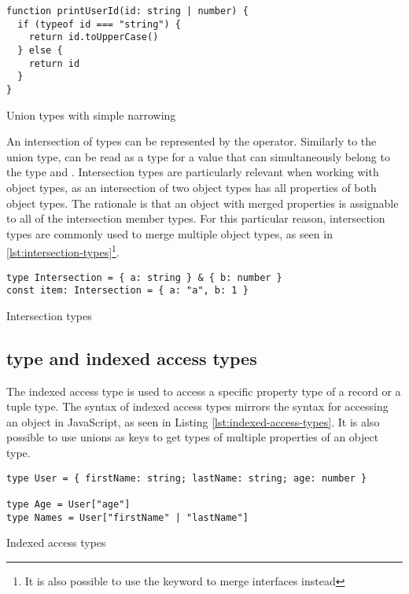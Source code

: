 \begin{listing}[ht]
  \begin{verbatim}
function printUserId(id: string | number) {
  if (typeof id === "string") {
    return id.toUpperCase()
  } else {
    return id
  }
}
  \end{verbatim}
  \caption{Union types with simple narrowing}\label{lst:union-types}
\end{listing}

An intersection of types can be represented by the \code{\&} operator. Similarly to the union type,  can be read as a type for a value that can simultaneously belong to the type  and . Intersection types are particularly relevant when working with object types, as an intersection of two object types has all properties of both object types. The rationale is that an object with merged properties is assignable to all of the intersection member types. For this particular reason, intersection types are commonly used to merge multiple object types, as seen in \ref{lst:intersection-types}\footnote{It is also possible to use the  keyword to merge interfaces instead}.

\begin{listing}[ht]
  \begin{verbatim}
type Intersection = { a: string } & { b: number }
const item: Intersection = { a: "a", b: 1 }
  \end{verbatim}
  \caption{Intersection types}\label{lst:intersection-types}
\end{listing}

\subsection{ type and indexed access types}

The indexed access type is used to access a specific property type of a record or a tuple type. The syntax of indexed access types mirrors the syntax for accessing an object in JavaScript, as seen in Listing \ref{lst:indexed-access-types}. It is also possible to use unions as keys to get types of multiple properties of an object type.

\begin{listing}[ht]
  \begin{verbatim}
type User = { firstName: string; lastName: string; age: number }

type Age = User["age"] 
type Names = User["firstName" | "lastName"]
\end{verbatim}
  \caption{Indexed access types}\label{lst:indexed-access-types}
\end{listing}

